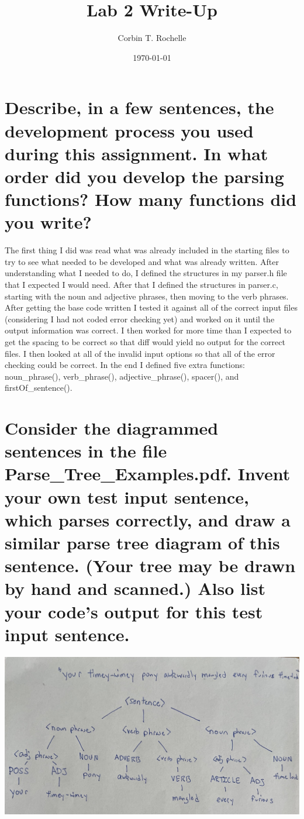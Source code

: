 \documentclass[12pt]{article}
\author{Corbin T. Rochelle}
\title{Lab 2 Write-Up}
\date{\today}
\begin{document}
\maketitle

\section{Describe, in a few sentences, the development process you used during this assignment. In what order did you develop the parsing functions? How many functions did you write?}

The first thing I did was read what was already included in the starting files to try to see what needed to be developed and what was already written.
After understanding what I needed to do, I defined the structures in my parser.h file that I expected I would need. 
After that I defined the structures in parser.c, starting with the noun and adjective phrases, then moving to the verb phrases. 
After getting the base code written I tested it against all of the correct input files (considering I had not coded error checking yet) and worked on it until the output information was correct.
I then worked for more time than I expected to get the spacing to be correct so that diff would yield no output for the correct files.
I then looked at all of the invalid input options so that all of the error checking could be correct. 
In the end I defined five extra functions: noun\_phrase(), verb\_phrase(), adjective\_phrase(), spacer(), and firstOf\_sentence(). 

\section{Consider the diagrammed sentences in the file Parse\_Tree\_Examples.pdf. Invent your own test input sentence, which parses correctly, and draw a similar parse tree diagram of this sentence. (Your tree may be drawn by hand and scanned.) Also list your code's output for this test input sentence.}

\includegraphics[width=\textwidth]{diagram.jpeg}
\end{document}
